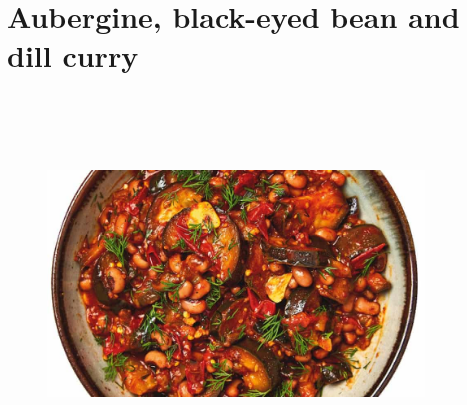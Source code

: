 \documentclass{book}
\begin{document}
\section{Aubergine, black-eyed bean and dill curry}
\begin{figure}
\centering\includegraphics[width=10cm,height=10cm,keepaspectratio]{Recipe_Pictures/Aubergine,_black-eyed_bean_and_dill_curry.png}
\end{figure}
\end{document}
